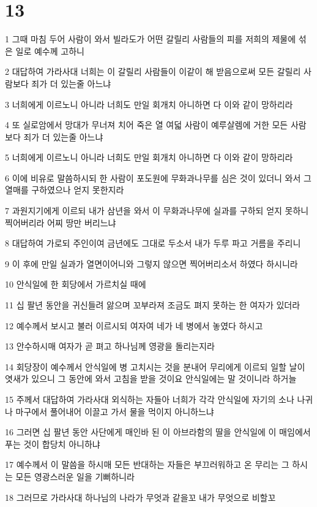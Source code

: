 \chapter{13}

\par 1 그때 마침 두어 사람이 와서 빌라도가 어떤 갈릴리 사람들의 피를 저희의 제물에 섞은 일로 예수께 고하니
\par 2 대답하여 가라사대 너희는 이 갈릴리 사람들이 이같이 해 받음으로써 모든 갈릴리 사람보다 죄가 더 있는줄 아느냐
\par 3 너희에게 이르노니 아니라 너희도 만일 회개치 아니하면 다 이와 같이 망하리라
\par 4 또 실로암에서 망대가 무너져 치어 죽은 열 여덟 사람이 예루살렘에 거한 모든 사람보다 죄가 더 있는줄 아느냐
\par 5 너희에게 이르노니 아니라 너희도 만일 회개치 아니하면 다 이와 같이 망하리라
\par 6 이에 비유로 말씀하시되 한 사람이 포도원에 무화과나무를 심은 것이 있더니 와서 그 열매를 구하였으나 얻지 못한지라
\par 7 과원지기에게 이르되 내가 삼년을 와서 이 무화과나무에 실과를 구하되 얻지 못하니 찍어버리라 어찌 땅만 버리느냐
\par 8 대답하여 가로되 주인이여 금년에도 그대로 두소서 내가 두루 파고 거름을 주리니
\par 9 이 후에 만일 실과가 열면이어니와 그렇지 않으면 찍어버리소서 하였다 하시니라
\par 10 안식일에 한 회당에서 가르치실 때에
\par 11 십 팔년 동안을 귀신들려 앓으며 꼬부라져 조금도 펴지 못하는 한 여자가 있더라
\par 12 예수께서 보시고 불러 이르시되 여자여 네가 네 병에서 놓였다 하시고
\par 13 안수하시매 여자가 곧 펴고 하나님께 영광을 돌리는지라
\par 14 회당장이 예수께서 안식일에 병 고치시는 것을 분내어 무리에게 이르되 일할 날이 엿새가 있으니 그 동안에 와서 고침을 받을 것이요 안식일에는 말 것이니라 하거늘
\par 15 주께서 대답하여 가라사대 외식하는 자들아 너희가 각각 안식일에 자기의 소나 나귀나 마구에서 풀어내어 이끌고 가서 물을 먹이지 아니하느냐
\par 16 그러면 십 팔년 동안 사단에게 매인바 된 이 아브라함의 딸을 안식일에 이 매임에서 푸는 것이 합당치 아니하냐
\par 17 예수께서 이 말씀을 하시매 모든 반대하는 자들은 부끄러워하고 온 무리는 그 하시는 모든 영광스러운 일을 기뻐하니라
\par 18 그러므로 가라사대 하나님의 나라가 무엇과 같을꼬 내가 무엇으로 비할꼬
